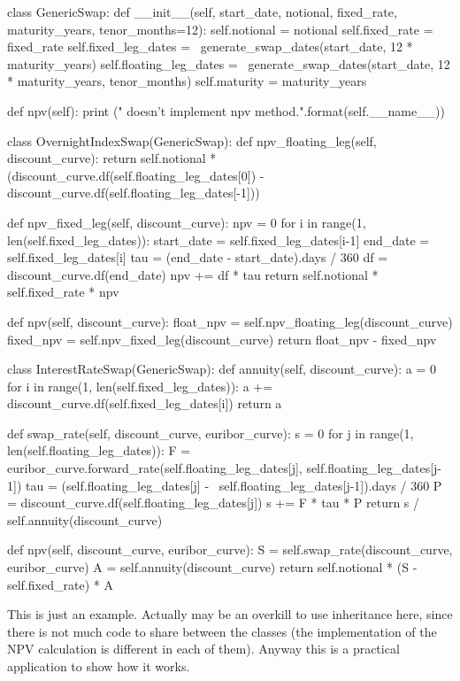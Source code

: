 \begin{ipython}
class GenericSwap:
    def __init__(self, start_date, notional,
                 fixed_rate, maturity_years, tenor_months=12):        
        self.notional = notional
        self.fixed_rate = fixed_rate
        self.fixed_leg_dates = \
            generate_swap_dates(start_date, 12 * maturity_years)
        self.floating_leg_dates = \
            generate_swap_dates(start_date, 12 * maturity_years, tenor_months)
        self.maturity = maturity_years

    def npv(self):
        print ("{} doesn't implement npv method.".format(self.__name__))

class OvernightIndexSwap(GenericSwap):
    def npv_floating_leg(self, discount_curve):
        return self.notional * (discount_curve.df(self.floating_leg_dates[0]) -
            discount_curve.df(self.floating_leg_dates[-1]))

    def npv_fixed_leg(self, discount_curve):
        npv = 0
        for i in range(1, len(self.fixed_leg_dates)):
            start_date = self.fixed_leg_dates[i-1]
            end_date = self.fixed_leg_dates[i]
            tau = (end_date - start_date).days / 360
            df = discount_curve.df(end_date)
            npv += df * tau 
        return self.notional * self.fixed_rate * npv

    def npv(self, discount_curve):
        float_npv = self.npv_floating_leg(discount_curve)
        fixed_npv = self.npv_fixed_leg(discount_curve)
        return float_npv - fixed_npv

class InterestRateSwap(GenericSwap):
    def annuity(self, discount_curve):
        a = 0
        for i in range(1, len(self.fixed_leg_dates)):
            a += discount_curve.df(self.fixed_leg_dates[i])
        return a

    def swap_rate(self, discount_curve, euribor_curve):
        s = 0
        for j in range(1, len(self.floating_leg_dates)):
            F = euribor_curve.forward_rate(self.floating_leg_dates[j], 
            self.floating_leg_dates[j-1])
            tau = (self.floating_leg_dates[j] - \
                self.floating_leg_dates[j-1]).days / 360
            P = discount_curve.df(self.floating_leg_dates[j])
            s += F * tau * P
        return s / self.annuity(discount_curve)

    def npv(self, discount_curve, euribor_curve):
        S = self.swap_rate(discount_curve, euribor_curve)
        A = self.annuity(discount_curve)
        return self.notional * (S - self.fixed_rate) * A
\end{ipython}
\begin{finmarkets}
This is just an example. Actually may be an overkill to use inheritance here, since there is not much code to share between the classes (the implementation of the NPV calculation is different in each of them). Anyway this is a practical application to show how it works.
\end{finmarkets}

